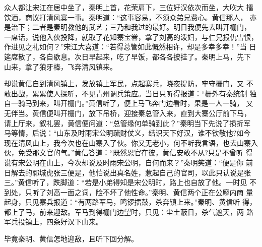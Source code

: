 众人都让宋江在居中坐了，秦明上首，花荣肩下，三位好汉依次而坐，大吹大
擂饮酒，商议打清风寨一事。秦明道：“这事容易，不须众弟兄费心。黄信那人，
亦是治下；二者是秦明教他的武艺；三乃和我过的最好。明日我便先去叫开栅门，
一席话，说他入伙投降，就取了花知寨宝眷，拿了刘高的泼妇，与仁兄报仇雪恨，
作进见之礼如何？”宋江大喜道：“若得总管如此慨然相许，却是多幸多幸！”当
日筵席散了，各自歇息。次日早起来，吃了早饭，都各各披挂了。秦明上马，先下
山来，拿了狼牙棒，飞奔清风镇来。

却说黄信自到清风镇上，发放镇上军民，点起寨兵，晓夜提防，牢守栅门，又
不敢出战，累累使人探听，不见青州调兵策应。当日只听得报道：“栅外有秦统制
独自一骑马到来，叫开栅门。”黄信听了，便上马飞奔门边看时，果是一人一骑，
又无伴当。黄信便叫开栅门，放下吊桥，迎接秦总管入来，直到大寨公厅前下马，
请上厅来，叙礼罢，黄信便问道：“总管缘何单骑到此？”秦明当下先说了损折军
马等情，后说：“山东及时雨宋公明疏财仗义，结识天下好汉，谁不钦敬他?如今
现在清风山上，我今次也在山寨入了伙。你又无老小，何不听我言语，也去山寨入
伙，免受那文官的气。”黄信答道：“既然恩官在彼，黄信安敢不从?只是不曾听
得说有宋公明在山上，今次却说及时雨宋公明，自何而来？”秦明笑道：“便是你
前日解去的郓城虎张三便是，他怕说出真名姓，惹起自己的官司，以此只认说是张
三。”黄信听了，跌脚道：“若是小弟得知是宋公明时，路上也自放了他。一时见
不到处，只听了刘高一面之词，险不坏了他性命。”秦明、黄信两个正在公廨内商
量起身，只见寨兵报道：“有两路军马，鸣锣擂鼓，杀奔镇上来。”秦明、黄信听
得，都上了马，前来迎敌。军马到得栅门边望时，只见：尘土蔽日，杀气遮天，两
路军兵投镇上，四条好汉下山来。

毕竟秦明、黄信怎地迎敌，且听下回分解。